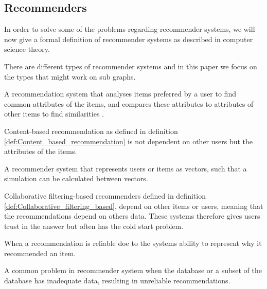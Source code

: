 \subsection{Recommenders}
In order to solve some of the problems regarding recommender systems, we will now give a formal definition of recommender systems as described in computer science theory. 

There are different types of recommender systems and in this paper we focus on the types that might work on sub graphs.

\begin{definition} \label{def:Content_based_recommendation}
A recommendation system that analyses items preferred by a user to find common attributes of the items, and compares these attributes to attributes of other items to find similarities \cite{lu2015recommender}. 
\end{definition}

Content-based recommendation as defined in definition  \autoref{def:Content_based_recommendation} is not dependent on other users but the attributes of the items.

\begin{definition}\label{def:Collaborative_filtering_based}
A recommender system that represents users or items as vectors, such that a simulation can be calculated between vectors\cite{lu2015recommender}.
\end{definition}

Collaborative filtering-based recommenders defined in definition \autoref{def:Collaborative_filtering_based}, depend on other items or users, meaning that the recommendations depend on others data. These systems therefore gives users trust in the answer but often has the cold start problem.

\begin{definition}[Trust]\label{def:trust}
When a recommendation is reliable doe to the systems ability to represent why it recommended an item\cite{Ricci2015}.
\end{definition}

\begin{definition}\label{def:cold_start_problem}
A common problem in recommender system when the database or a subset of the database has inadequate data, resulting in unreliable recommendations\cite{Ricci2015}.
\end{definition}
